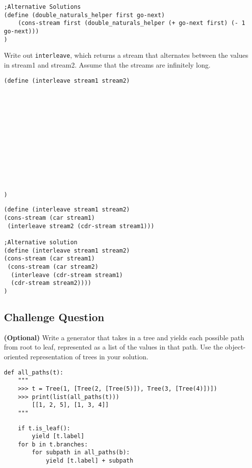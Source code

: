 \documentclass{exam}
\begin{document}
\begin{questions}
\begin{blocksection}
\begin{solution}
\begin{lstlisting}
;Alternative Solutions
(define (double_naturals_helper first go-next)
    (cons-stream first (double_naturals_helper (+ go-next first) (- 1 go-next)))
)
\end{lstlisting}
\end{solution}
\end{blocksection}

\begin{blocksection}
\question Write out \texttt{interleave}, which returns a stream that alternates between the values in stream1 and stream2. Assume that the streams are infinitely long.
\begin{lstlisting}
(define (interleave stream1 stream2)













)
\end{lstlisting}

\begin{solution}
\begin{lstlisting}
(define (interleave stream1 stream2)
(cons-stream (car stream1) 
 (interleave stream2 (cdr-stream stream1)))

;Alternative solution
(define (interleave stream1 stream2)
(cons-stream (car stream1) 
 (cons-stream (car stream2)
  (interleave (cdr-stream stream1)
  (cdr-stream stream2))))
)
\end{lstlisting}
\end{solution}
\end{blocksection}


\newpage

\begin{blocksection}
\section{Challenge Question}
\question \textbf{(Optional)} Write a generator that takes in a tree and yields each possible path from root to leaf, represented as a list of the values in that path. Use the object-oriented representation of trees in your solution.
\newline

\begin{lstlisting}
def all_paths(t):
    """
    >>> t = Tree(1, [Tree(2, [Tree(5)]), Tree(3, [Tree(4)])])
    >>> print(list(all_paths(t)))
        [[1, 2, 5], [1, 3, 4]]
    """    
\end{lstlisting}

\begin{solution}[0.5in]
\begin{lstlisting}
    if t.is_leaf():
        yield [t.label]
    for b in t.branches:
        for subpath in all_paths(b):
            yield [t.label] + subpath
\end{lstlisting}

\end{solution}
\end{blocksection}
\end{questions}




\end{document}
